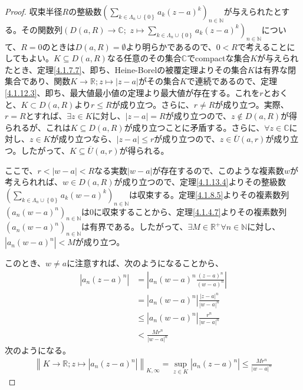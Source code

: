 \documentclass[dvipdfmx]{jsarticle}
\begin{document}
\begin{proof}
収束半径$R$の整級数$\left( \sum_{k \in \varLambda_{n} \cup \left\{ 0 \right\}} {a_{k}(z - a)^{k}} \right)_{n \in \mathbb{N}}$が与えられたとする。その関数列$\left( D(a,R) \rightarrow \mathbb{C};\right. $ $\left. z \mapsto \sum_{k \in \varLambda_{n} \cup \left\{ 0 \right\}} {a_{k}(z - a)^{k}} \right)_{n \in \mathbb{N}}$について、$R = 0$のときは$D(a,R) = \emptyset$より明らかであるので、$0 < R$で考えることにしてもよい。$K \subseteq D(a,R)$なる任意のその集合$\mathbb{C}$でcompactな集合$K$が与えられたとき、定理\ref{4.1.7.7}、即ち、Heine-Borelの被覆定理よりその集合$K$は有界な閉集合であり、関数$K \rightarrow \mathbb{R};z \mapsto |z - a|$がその集合$K$で連続であるので、定理\ref{4.1.12.3}、即ち、最大値最小値の定理より最大値が存在する。これを$r$とおくと、$K \subset D(a,R)$より$r \leq R$が成り立つ。さらに、$r \neq R$が成り立つ。実際、$r = R$とすれば、$\exists z \in K$に対し、$|z - a| = R$が成り立つので、$z \notin D(a,R)$が得られるが、これは$K \subseteq D(a,R)$が成り立つことに矛盾する。さらに、$\forall z \in \mathbb{C}$に対し、$z \in K$が成り立つなら、$|z - a| \leq r$が成り立つので、$z \in \overline{U}(a,r)$が成り立つ。したがって、$K \subseteq \overline{U}(a,r)$が得られる。\par
ここで、$r < |w - a| < R$なる実数$|w - a|$が存在するので、このような複素数$w$が考えられれば、$w \in D(a,R)$が成り立つので、定理\ref{4.1.13.4}よりその整級数$\left( \sum_{k \in \varLambda_{n} \cup \left\{ 0 \right\}} {a_{k}(w - a)^{k}} \right)_{n \in \mathbb{N}}$は収束する。定理\ref{4.1.8.5}よりその複素数列$\left( a_{n}(w - a)^{n} \right)_{n \in \mathbb{N}}$は$0$に収束することから、定理\ref{4.1.4.7}よりその複素数列$\left( a_{n}(w - a)^{n} \right)_{n \in \mathbb{N}}$は有界である。したがって、$\exists M \in \mathbb{R}^{+}\forall n \in \mathbb{N}$に対し、$\left| a_{n}(w - a)^{n} \right| < M$が成り立つ。\par
このとき、$w \neq a$に注意すれば、次のようになることから、
\begin{align*}
\left| a_{n}(z - a)^{n} \right| &= \left| a_{n}(w - a)^{n}\frac{(z - a)^{n}}{(w - a)^{n}} \right|\\
&= \left| a_{n}(w - a)^{n} \right|\frac{|z - a|^{n}}{|w - a|^{n}}\\
&\leq \left| a_{n}(w - a)^{n} \right|\frac{r^{n}}{|w - a|^{n}}\\
&< \frac{Mr^{n}}{|w - a|^{n}}
\end{align*}
次のようになる。
\begin{align*}
\left\| K \rightarrow \mathbb{R};z \mapsto \left| a_{n}(z - a)^{n} \right| \right\|_{K,\infty} = \sup_{z \in K}\left| a_{n}(z - a)^{n} \right| \leq \frac{Mr^{n}}{|w - a|^{n}}

\end{align*}
\end{proof}
\end{document}

